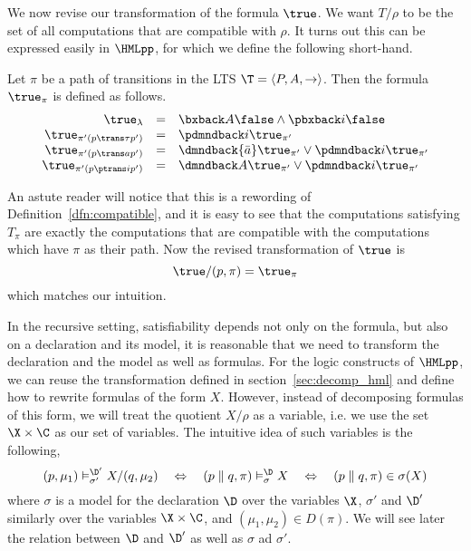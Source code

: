 We now revise our transformation of the formula $\true$. We want $T/\rho$ to be
the set of all computations that are compatible with $\rho$. It turns out this
can be expressed easily in $\HMLpp$, for which we define the following short-hand.
\begin{definition}
    Let $\pi$ be a path of transitions in the LTS
    $\T = \langle P,A,\rightarrow \rangle$.
    Then the \HMLpp{} formula $\true_\pi$ is defined as follows.
    \[ \begin{array}{rcl}
        \true_\lambda &=& \bxback A \false \land \pbxback i \false \\
        \true_{\pi'(p\trans \tau p')} &=& \pdmndback i \true_{\pi'} \\
        \true_{\pi'(p\trans a p')} &=& \dmndback{\bar a} \true_{\pi'}  \lor \pdmndback i \true_{\pi'} \\
        \true_{\pi'(p\ptrans i p')} &=& \dmndback A \true_{\pi'} \lor \pdmndback i \true_{\pi'} \\
    \end{array} \]
\end{definition}
An astute reader will notice that this is a rewording of Definition~\ref{dfn:compatible},
and it is easy to see that the computations satisfying $T_\pi$ are exactly the computations
that are compatible with the computations which have $\pi$ as their path. 
Now the revised transformation of $\true$ is
\begin{equation}
\true/(p,\pi) = \true_\pi
\end{equation}
which matches our intuition.

\hspace{1cm}

In the recursive setting, satisfiability depends not only on the formula, 
but also on a declaration
and its model, it is reasonable that we need to transform the declaration and
the model as well as formulas.
For the logic constructs of $\HMLpp$, we can reuse the transformation defined
in section~\ref{sec:decomp_hml} and define how to rewrite formulas of the form $X$. 
However, instead
of decomposing formulas of this form, we will treat the quotient $X/\rho$
as a variable, i.e. we use the set $\X\times\C$ as our set of variables. 
The intuitive idea of such variables is the following,
\[
(p,\mu_1) \vDash^{\D'}_{\sigma'} X/(q,\mu_2)
\quad \Leftrightarrow \quad
(p\parallel q, \pi) \vDash^\D_\sigma X
\quad \Leftrightarrow \quad
(p\parallel q, \pi) \in \sigma(X)
\]
where $\sigma$ is a model for the declaration $\D$ over the variables $\X$, 
$\sigma'$ and $\D'$ similarly over the variables $\X\times\C$,
and $(\mu_1,\mu_2)\in D(\pi)$. 
We will see later the relation between $\D$ and $\D'$
as well as $\sigma$ ad $\sigma'$.


